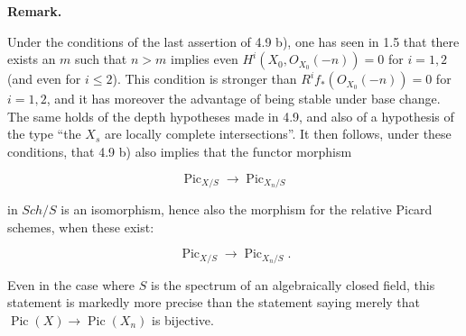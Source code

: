 \documentclass[
  11pt,
  a4paper,
]{book}
\begin{document}
\textbf{Remark.}

Under the conditions of the last assertion of 4.9 b), one has seen in
1.5 that there exists an \(m\) such that \(n > m\) implies even
\(H^{i}(X_{0}, O_{X_{0}}(-n)) = 0\) for \(i = 1, 2\) (and even for
\(i \leqslant 2\)). This condition is stronger than
\(R^{i}f_{\ast}(O_{X_{0}}(-n)) = 0\) for \(i = 1, 2\), and it has
moreover the advantage of being stable under base change. The same holds
of the depth hypotheses made in 4.9, and also of a hypothesis of the
type ``the \(X_{s}\) are locally complete intersections''. It then
follows, under these conditions, that 4.9 b) also implies that the
functor morphism

\[ \operatorname{Pic}_{X/S} \to \operatorname{Pic}_{X_{n}/S} \]

in \(Sch/S\) is an isomorphism, hence also the morphism for the relative
Picard schemes, when these exist:

\[ \operatorname{Pic}_{X/S} \to \operatorname{Pic}_{X_{n}/S}. \]

Even in the case where \(S\) is the spectrum of an algebraically closed
field, this statement is markedly more precise than the statement saying
merely that \(\operatorname{Pic}(X) \to \operatorname{Pic}(X_{n})\) is
bijective.
\end{document}
